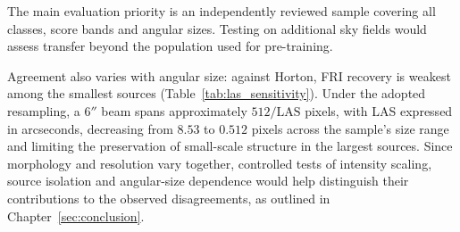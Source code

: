 The main evaluation priority is an independently reviewed sample covering all classes, score bands and angular sizes. Testing on additional sky fields would assess transfer beyond the population used for pre-training.

Agreement also varies with angular size: against Horton, FRI recovery is weakest among the smallest sources (Table~\ref{tab:las_sensitivity}). Under the adopted resampling, a \(6''\) beam spans approximately \(512/\mathrm{LAS}\) pixels, with LAS expressed in arcseconds, decreasing from \(8.53\) to \(0.512\) pixels across the sample's size range and limiting the preservation of small-scale structure in the largest sources. Since morphology and resolution vary together, controlled tests of intensity scaling, source isolation and angular-size dependence would help distinguish their contributions to the observed disagreements, as outlined in Chapter~\ref{sec:conclusion}.

